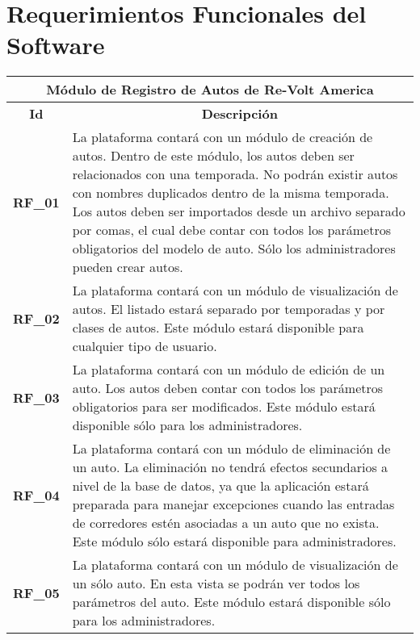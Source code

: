 \section{Requerimientos Funcionales del Software}
\begin{center}
	\begin{tabular}{ | l | p{15cm} |}
		\hline
		\multicolumn{2}{|c|}{\textbf{Módulo de Registro de Autos de Re-Volt America}} \\
		\hline
		\multicolumn{1}{|c|}{\textbf{Id}} & \multicolumn{1}{|c|}{\textbf{Descripción}} \\
		\hline
		{\textbf{RF\_01}} & La plataforma contará con un módulo de creación de autos. Dentro de este módulo, los autos deben ser relacionados con una temporada. No podrán existir autos con nombres duplicados dentro de la misma temporada. Los autos deben ser importados desde un archivo separado por comas, el cual debe contar con todos los parámetros obligatorios del modelo de auto. Sólo los administradores pueden crear autos. \\ \hline

		{\textbf{RF\_02}} & La plataforma contará con un módulo de visualización de autos. El listado estará separado por temporadas y por clases de autos. Este módulo estará disponible para cualquier tipo de usuario. \\ \hline

		{\textbf{RF\_03}} & La plataforma contará con un módulo de edición de un auto. Los autos deben contar con todos los parámetros obligatorios para ser modificados. Este módulo estará disponible sólo para los administradores. \\ \hline
		
		{\textbf{RF\_04}} & La plataforma contará con un módulo de eliminación de un auto. La eliminación no tendrá efectos secundarios a nivel de la base de datos, ya que la aplicación estará preparada para manejar excepciones cuando las entradas de corredores estén asociadas a un auto que no exista. Este módulo sólo estará disponible para administradores. \\ \hline
		
		{\textbf{RF\_05}} & La plataforma contará con un módulo de visualización de un sólo auto. En esta vista se podrán ver todos los parámetros del auto. Este módulo estará disponible sólo para los administradores. \\ \hline
	\end{tabular}
\end{center}

